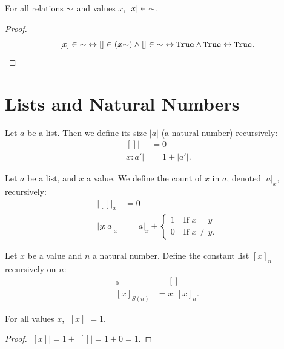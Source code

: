\documentclass[../../math.tex]{subfiles}
\begin{document}
\begin{theorem} \label{list_prop2_single}
    For all relations ${\sim}$ and values $x$, $[x] \in {\sim}$.
\end{theorem}
\begin{proof}
    \[
        [x] \in \usim
        \leftrightarrow [] \in (x\usim) \wedge [] \in \usim
        \leftrightarrow \vtt{True} \wedge \vtt{True}
        \leftrightarrow \vtt{True}.
    \]
\end{proof}

\section{Lists and Natural Numbers}

\begin{definition}
    Let $a$ be a list.  Then we define its size $|a|$ (a natural number)
    recursively:
    \begin{align*}
            |[]| &= 0 \\
        |x : a'| &= 1 + |a'|.
    \end{align*}
\end{definition}

\begin{definition}
    Let $a$ be a list, and $x$ a value.  We define the count of $x$ in $a$,
    denoted $|a|_x$, recursively:
    \begin{align*}
           |[]|_x &= 0 \\
        |y : a|_x &= |a|_x + \begin{cases}
            1 \quad \text{If $x = y$} \\
            0 \quad \text{If $x \neq y$}.
        \end{cases}
    \end{align*}
\end{definition}

\begin{definition}
    Let $x$ be a value and $n$ a natural number.  Define the constant list
    $[x]_n$ recursively on $n$:
    \begin{align*}
        [x]_0 &= [] \\
        [x]_{S(n)} &= x : [x]_n.
    \end{align*}
\end{definition}

\begin{theorem}
    For all values $x$, $|[x]| = 1$.
\end{theorem}
\begin{proof}
    $|[x]| = 1 + |[]| = 1 + 0 = 1$.
\end{proof}
\end{document}
